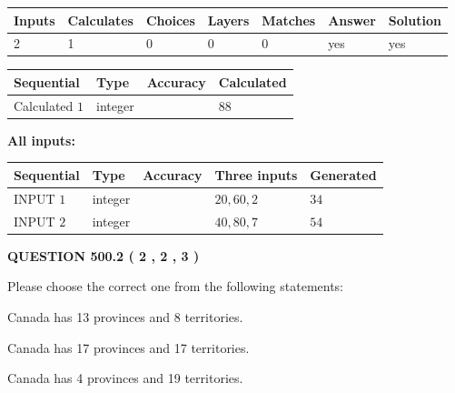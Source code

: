 \documentclass[12pt]{article}
\begin{document}
   
\noindent\begin{tabular}{|l|l|l|l|l|l|l|}
 \hline
Inputs & Calculates & Choices & Layers & Matches & Answer & Solution \\ \hline
 2  & 
 1  & 
 0
  & 
 0  & 
 0  & 
  yes & 
  yes 
  \\ \hline
 \end{tabular}
   
   
   
   
\noindent{}
   
   
  
  
\noindent\begin{tabular}{|l|l|l|l|}
\hline
 Sequential & Type & Accuracy & Calculated \\ 
\hline
 
 
  Calculated $  1 $ & integer &  & 
  $ 88 $ 
 \\  \hline  
 \end{tabular}
   
   
   
   
\noindent\vspace{0.1in}\hspace{-0.08in} {\textbf{\Large{All inputs: }}}
   
   
  
  
\noindent\begin{tabular}{|l|l|l|l|l|}
\hline
 Sequential & Type & Accuracy & Three inputs & Generated \\ 
\hline
 
 
  INPUT $  1 $ & integer &  & $
 20
 , 
 60
 , 
 2
 $ & $ 34 $ 
 \\  \hline  
 
 
  INPUT $  2 $ & integer &  & $
 40
 , 
 80
 , 
 7
 $ & $ 54 $ 
 \\  \hline  
 \end{tabular}
   
   
  
\vspace{0.2in}
  
{\textbf{\Large{QUESTION
500.2 
 ( 2 , 2 , 3 )
}}}
  
  
Please choose the correct one from the following statements:
 
 
Canada has  13 provinces and  8 territories.
 
 
Canada has  17 provinces and  17 territories.
 
 
Canada has   4 provinces and  19 territories.
 
\end{document}
